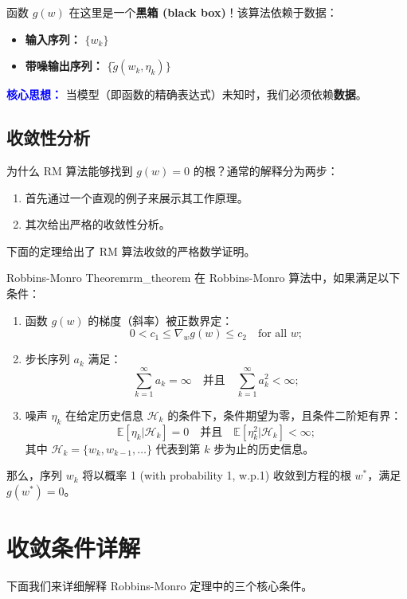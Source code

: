 \documentclass[12pt, a4paper]{article}
\newcommand{\E}{\mathbb{E}} %
\begin{document}
函数 $g(w)$ 在这里是一个\textbf{黑箱 (black box)}！该算法依赖于数据：
\begin{itemize}
    \item \textbf{输入序列：} $\{w_k\}$
    \item \textbf{带噪输出序列：} $\{\tilde{g}(w_k, \eta_k)\}$
\end{itemize}
\textcolor{blue}{\textbf{核心思想：}} 当模型（即函数的精确表达式）未知时，我们必须依赖\textbf{数据}。

\subsection{收敛性分析}
为什么 RM 算法能够找到 $g(w)=0$ 的根？通常的解释分为两步：
\begin{enumerate}
    \item 首先通过一个直观的例子来展示其工作原理。
    \item 其次给出严格的收敛性分析。
\end{enumerate}
下面的定理给出了 RM 算法收敛的严格数学证明。

\begin{theorembox}{Robbins-Monro Theorem}{rm_theorem}
在 Robbins-Monro 算法中，如果满足以下条件：
\begin{enumerate}[label=\arabic*)]
    \item 函数 $g(w)$ 的梯度（斜率）被正数界定：
    \[ 0 < c_1 \le \nabla_w g(w) \le c_2 \quad \text{for all } w; \]
    
    \item 步长序列 $a_k$ 满足：
    \[ \sum_{k=1}^{\infty} a_k = \infty \quad \text{并且} \quad \sum_{k=1}^{\infty} a_k^2 < \infty; \]
    
    \item 噪声 $\eta_k$ 在给定历史信息 $\mathcal{H}_k$ 的条件下，条件期望为零，且条件二阶矩有界：
    \[ \E[\eta_k | \mathcal{H}_k] = 0 \quad \text{并且} \quad \E[\eta_k^2 | \mathcal{H}_k] < \infty; \]
    其中 $\mathcal{H}_k = \{w_k, w_{k-1}, \dots\}$ 代表到第 $k$ 步为止的历史信息。
\end{enumerate}
那么，序列 $w_k$ 将以概率 1 (with probability 1, w.p.1) 收敛到方程的根 $w^*$，满足 $g(w^*) = 0$。
\end{theorembox}

\section{收敛条件详解}
下面我们来详细解释 Robbins-Monro 定理中的三个核心条件。
\end{document}
